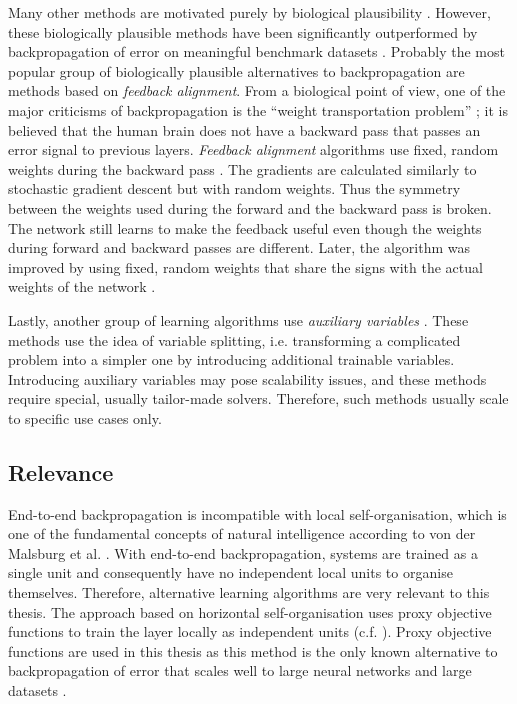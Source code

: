 Many other methods are motivated purely by biological plausibility .
However, these biologically plausible methods have been significantly outperformed by backpropagation of error on meaningful benchmark datasets .
Probably the most popular group of biologically plausible alternatives to backpropagation are methods based on \emph{feedback alignment}.
From a biological point of view, one of the major criticisms of backpropagation is the ``weight transportation problem'' ; it is believed that the human brain does not have a backward pass that passes an error signal to previous layers.
\emph{Feedback alignment} algorithms use fixed, random weights during the backward pass .
The gradients are calculated similarly to stochastic gradient descent but with random weights.
Thus the symmetry between the weights used during the forward and the backward pass is broken.
The network still learns to make the feedback useful even though the weights during forward and backward passes are different. 
Later, the algorithm was improved by using fixed, random weights that share the signs with the actual weights of the network .

Lastly, another group of learning algorithms use \emph{auxiliary variables} .
These methods use the idea of variable splitting, i.e. transforming a complicated problem into a simpler one by introducing additional trainable variables.
Introducing auxiliary variables may pose scalability issues, and these methods require special, usually tailor-made solvers.
Therefore, such methods usually scale to specific use cases only.

\subsection{Relevance}
End-to-end backpropagation is incompatible with local self-organisation, which is one of the fundamental concepts of natural intelligence according to von der Malsburg et al. .
With end-to-end backpropagation, systems are trained as a single unit and consequently have no independent local units to organise themselves.
Therefore, alternative learning algorithms are very relevant to this thesis.
The approach based on horizontal self-organisation uses proxy objective functions to train the layer locally as independent units (c.f. ).
Proxy objective functions are used in this thesis as this method is the only known alternative to backpropagation of error that scales well to large neural networks and large datasets .


